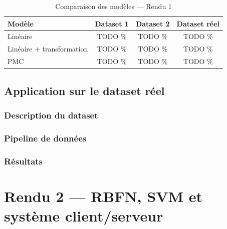 \documentclass[12pt, a4paper]{report}
\begin{document}

\begin{table}[H]
\centering
\begin{tabular}{lccc}
\toprule
\textbf{Modèle} & \textbf{Dataset 1} & \textbf{Dataset 2} & \textbf{Dataset réel} \\
\midrule
Linéaire & TODO \% & TODO \% & TODO \% \\
Linéaire + transformation & TODO \% & TODO \% & TODO \% \\
PMC & TODO \% & TODO \% & TODO \% \\
\bottomrule
\end{tabular}
\caption{Comparaison des modèles — Rendu 1}
\end{table}

\section{Application sur le dataset réel}

\subsection{Description du dataset}


\subsection{Pipeline de données}


\subsection{Résultats}


\chapter{Rendu 2 — RBFN, SVM et système client/serveur}
\end{document}
